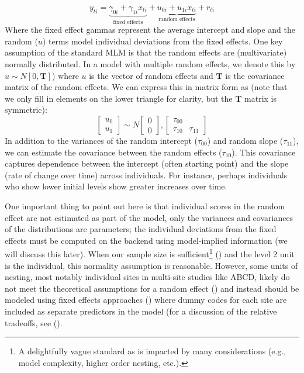\documentclass[11pt]{article}
\begin{document}
%
\begin{equation} \label{eq:3}
y_{ti} = \underbrace{\gamma_{0i} + \gamma_{1i}x_{ti}}_{\text{fixed effects}} + \underbrace{u_{0i} + u_{1i}x_{ti}}_{\text{random effects}} + r_{ti}
\end{equation}
%
Where the fixed effect gammas represent the average intercept and slope and the random ($u$) terms model individual deviations from the fixed effects. One key assumption of the standard MLM is that the random effects are (multivariate) normally distributed. In a model with multiple random effects, we denote this by $u \sim \mathit{N}[0, \mathbf{T}]$) where $u$ is the vector of random effects and $\mathbf{T}$ is the covariance matrix of the random effects. We can express this in matrix form as (note that we only fill in elements on the lower triangle for clarity, but the $\mathbf{T}$ matrix is symmetric):
%
\begin{equation} \label{eq:4}
\left[ \begin{array}{c} u_{0} \\ u_{1} \end{array} \right]  \sim \mathit{N}  \left[ \begin{array}{c} 0 \\ 0 \end{array} \right] , \left[ \begin{array}{cc} \tau_{00} & \\ \tau_{10} & \tau_{11} \end{array} \right] 
\end{equation}
%
In addition to the variances of the random intercept ($\tau_{00}$) and random slope ($\tau_{11}$), we can estimate the covariance between the random effects ($\tau_{10}$). This covariance captures dependence between the intercept (often starting point) and the slope (rate of change over time) across individuals. For instance, perhaps individuals who show lower initial levels show greater increases over time.

One important thing to point out here is that individual scores in the random effect are not estimated as part of the model, only the variances and covariances of the distributions are parameters; the individual deviations from the fixed effects must be computed on the backend using model-implied information (we will discuss this later). When our sample size is sufficient\footnote{A delightfully vague standard as  is impacted by many considerations (e.g., model complexity, higher order nesting, etc.).} (\cite{mcneish_small_2017,mcneish_modeling_2016}) and the level 2 unit is the individual, this normality assumption is reasonable. However, some units of nesting, most notably individual sites in multi-site studies like ABCD, likely do not meet the theoretical assumptions for a random effect (\cite{mcneish_unnecessary_2017}) and instead should be modeled using fixed effects approaches (\cite{mcneish_fixed_2019}) where dummy codes for each site are included as separate predictors in the model (for a discussion of the relative tradeoffs, see (\cite{feaster_modeling_2011}).
\end{document}
